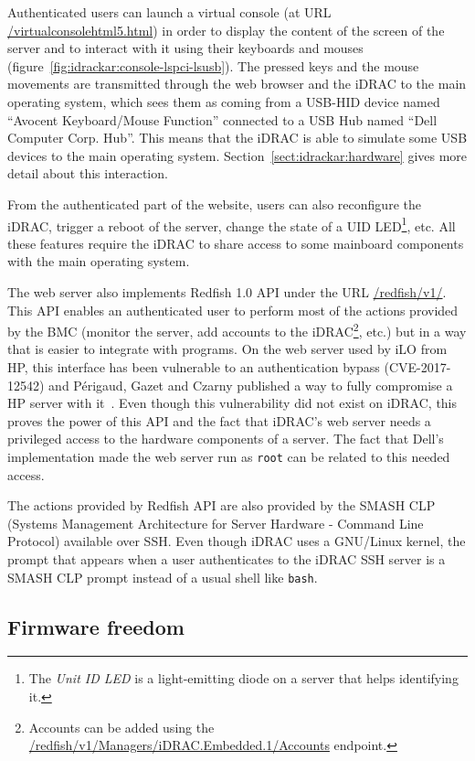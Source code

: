Authenticated users can launch a virtual console (at URL \url{/virtualconsolehtml5.html}) in order to display the content of the screen of the server and to interact with it using their keyboards and mouses (figure~\ref{fig:idrackar:console-lspci-lsusb}).
The pressed keys and the mouse movements are transmitted through the web browser and the iDRAC to the main operating system, which sees them as coming from a USB-HID device named ``Avocent Keyboard/Mouse Function'' connected to a USB Hub named ``Dell Computer Corp. Hub''.
This means that the iDRAC is able to simulate some USB devices to the main operating system.
Section~\ref{sect:idrackar:hardware} gives more detail about this interaction.

From the authenticated part of the website, users can also reconfigure the iDRAC, trigger a reboot of the server, change the state of a UID LED\footnote{The \emph{Unit ID LED} is a light-emitting diode on a server that helps identifying it.}, etc.
All these features require the iDRAC to share access to some mainboard components with the main operating system.

The web server also implements Redfish 1.0 API under the URL \url{/redfish/v1/}.
This API enables an authenticated user to perform most of the actions provided by the BMC (monitor the server, add accounts to the iDRAC\footnote{Accounts can be added using the \url{/redfish/v1/Managers/iDRAC.Embedded.1/Accounts} endpoint.}, etc.) but in a way that is easier to integrate with programs.
On the web server used by iLO from HP, this interface has been vulnerable to an authentication bypass (CVE-2017-12542) and Périgaud, Gazet and Czarny published a way to fully compromise a HP server with it~\cite{idrackar:recon2018ilo}.
Even though this vulnerability did not exist on iDRAC, this proves the power of this API and the fact that iDRAC's web server needs a privileged access to the hardware components of a server.
The fact that Dell's implementation made the web server run as \texttt{root} can be related to this needed access.

The actions provided by Redfish API are also provided by the SMASH CLP (Systems Management Architecture for Server Hardware - Command Line Protocol) available over SSH.
Even though iDRAC uses a GNU/Linux kernel, the prompt that appears when a user authenticates to the iDRAC SSH server is a SMASH CLP prompt instead of a usual shell like \texttt{bash}.

\subsection{Firmware freedom}

